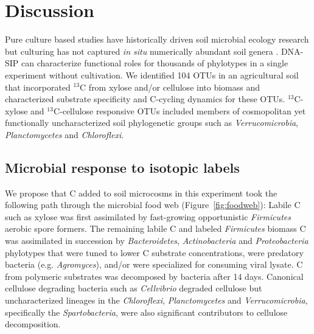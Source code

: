 \section{Discussion} 
Pure culture based studies have historically driven soil microbial ecology
research but culturing has not captured \textit{in situ} numerically abundant
soil genera \citep{Janssen2006}. DNA-SIP can characterize functional roles for
thousands of phylotypes in a single experiment without cultivation. We
identified 104 OTUs in an agricultural soil that incorporated $^{13}$C from
xylose and/or cellulose into biomass and characterized substrate specificity
and C-cycling dynamics for these OTUs. $^{13}$C-xylose and $^{13}$C-cellulose
responsive OTUs included members of cosmopolitan yet functionally
uncharacterized soil phylogenetic groups such as \textit{Verrucomicrobia},
\textit{Planctomycetes} and \textit{Chloroflexi}.

\subsection{Microbial response to isotopic labels}
We propose that C added to soil microcosms in this experiment took the
following path through the microbial food web (Figure~\ref{fig:foodweb}):
Labile C such as xylose was first assimilated by fast-growing opportunistic
\textit{Firmicutes} aerobic spore formers. The remaining labile C and labeled
\textit{Firmicutes} biomass C was assimilated
in succession by \textit{Bacteroidetes}, \textit{Actinobacteria} and
\textit{Proteobacteria} phylotypes that were tuned to lower C substrate
concentrations, were predatory bacteria (e.g. \textit{Agromyces}), and/or were
specialized for consuming viral lysate. C from polymeric substrates was
decomposed by bacteria after 14 days. Canonical cellulose degrading bacteria
such as \textit{Cellvibrio} degraded cellulose but uncharacterized lineages in
the \textit{Chloroflexi}, \textit{Planctomycetes} and \textit{Verrucomicrobia},
specifically the \textit{Spartobacteria}, were also significant contributors to
cellulose decomposition.

